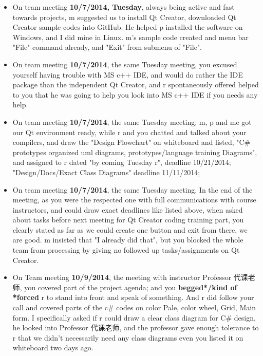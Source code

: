 \documentclass[9pt,b5paper]{article}
\begin{document}
\begin{itemize}
\item On team meeting \textbf{10/7/2014, Tuesday}, always being active and fast towards projects, m suggested us to install Qt Creator, downloaded Qt Creator sample codes into GitHub. He helped p installed the software on Windows, and I did mine in Linux. m's sample code created and menu bar "File" command already, and "Exit" from submenu of "File".
\item On team meeting \textbf{10/7/2014}, the same Tuesday meeting, you excused yourself having trouble with MS c++ IDE, and would do rather the IDE package than the independent Qt Creator, and r spontaneously offered helped to you that he was going to help you look into MS c++ IDE if you needs any help.

\item On team meeting \textbf{10/7/2014}, the same Tuesday meeting, m, p and me got our Qt environment ready, while r and you chatted and talked about your compilers, and draw the "Design Flowchart" on whiteboard and listed, "C\# prototypes organized uml diagrams, prototypes/language training Diagrams", and assigned to r dated "by coming Tuesday r", deadline 10/21/2014; "Design/Docs/Exact Class Diagrams" deadline 11/11/2014;

\item On team meeting \textbf{10/7/2014}, the same Tuesday meeting. In the end of the meeting, as you were the respected one with full communications with course instructors, and could draw exact deadlines like listed above, when asked about tasks before next meeting for Qt Creator coding training part, you clearly stated as far as we could create one button and exit from there, we are good. m insisted that "I already did that", but you blocked the whole team from processing by giving no followed up tasks/assignments on Qt Creator.

\item On Team meeting \textbf{10/9/2014}, the meeting with instructor Professor 代课老师, you covered part of the project agenda; and you \textbf{begged*/kind of *forced} r to stand into front and speak of something. And r did follow your call and covered parts of the c\# codes on color Pale, color wheel, Grid, Main form. I specifically asked if r could draw a clear class diagram for C\# design, he looked into Professor 代课老师, and the professor gave enough tolerance to r that we didn't necessarily need any class diagrams even you listed it on whiteboard two days ago.


\end{itemize}
\end{document}
